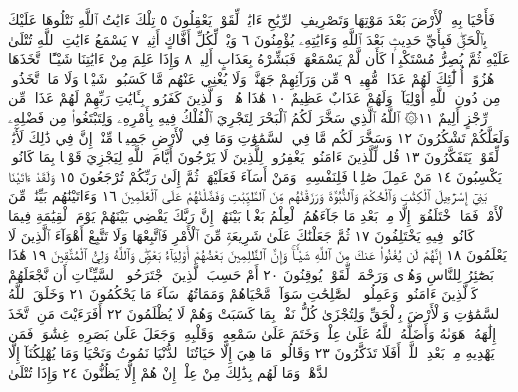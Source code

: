 فَأَحْيَا بِهِ ٱلْأَرْضَ بَعْدَ مَوْتِهَا وَتَصْرِيفِ ٱلرِّيَٰحِ ءَايَٰتࣱ لِّقَوْمࣲ يَعْقِلُونَ ٥
تِلْكَ ءَايَٰتُ ٱللَّهِ نَتْلُوهَا عَلَيْكَ بِٱلْحَقِّۖ فَبِأَيِّ حَدِيثِۭ بَعْدَ ٱللَّهِ وَءَايَٰتِهِۦ
يُؤْمِنُونَ ٦ وَيْلࣱ لِّكُلِّ أَفَّاكٍ أَثِيمࣲ ٧ يَسْمَعُ ءَايَٰتِ ٱللَّهِ تُتْلَىٰ عَلَيْهِ ثُمَّ
يُصِرُّ مُسْتَكْبِرࣰا كَأَن لَّمْ يَسْمَعْهَاۖ فَبَشِّرْهُ بِعَذَابٍ أَلِيمࣲ ٨ وَإِذَا عَلِمَ مِنْ ءَايَٰتِنَا
شَيْـًٔا ٱتَّخَذَهَا هُزُوًاۚ أُو۟لَٰٓئِكَ لَهُمْ عَذَابࣱ مُّهِينࣱ ٩ مِّن وَرَآئِهِمْ جَهَنَّمُۖ
وَلَا يُغْنِي عَنْهُم مَّا كَسَبُوا۟ شَيْـࣰٔا وَلَا مَا ٱتَّخَذُوا۟ مِن دُونِ ٱللَّهِ أَوْلِيَآءَۖ وَلَهُمْ
عَذَابٌ عَظِيمٌ ١٠ هَٰذَا هُدࣰىۖ وَٱلَّذِينَ كَفَرُوا۟ بِـَٔايَٰتِ رَبِّهِمْ لَهُمْ عَذَابࣱ مِّن
رِّجْزٍ أَلِيمٌ ١١۞ ٱللَّهُ ٱلَّذِي سَخَّرَ لَكُمُ ٱلْبَحْرَ لِتَجْرِيَ ٱلْفُلْكُ فِيهِ بِأَمْرِهِۦ
وَلِتَبْتَغُوا۟ مِن فَضْلِهِۦ وَلَعَلَّكُمْ تَشْكُرُونَ ١٢ وَسَخَّرَ لَكُم مَّا فِي ٱلسَّمَٰوَٰتِ
وَمَا فِي ٱلْأَرْضِ جَمِيعࣰا مِّنْهُۚ إِنَّ فِي ذَٰلِكَ لَأٓيَٰتࣲ لِّقَوْمࣲ يَتَفَكَّرُونَ ١٣
قُل لِّلَّذِينَ ءَامَنُوا۟ يَغْفِرُوا۟ لِلَّذِينَ لَا يَرْجُونَ أَيَّامَ ٱللَّهِ لِيَجْزِيَ
قَوْمَۢا بِمَا كَانُوا۟ يَكْسِبُونَ ١٤ مَنْ عَمِلَ صَٰلِحࣰا فَلِنَفْسِهِۦۖ
وَمَنْ أَسَآءَ فَعَلَيْهَاۖ ثُمَّ إِلَىٰ رَبِّكُمْ تُرْجَعُونَ ١٥ وَلَقَدْ ءَاتَيْنَا
بَنِيٓ إِسْرَٰٓءِيلَ ٱلْكِتَٰبَ وَٱلْحُكْمَ وَٱلنُّبُوَّةَ وَرَزَقْنَٰهُم مِّنَ ٱلطَّيِّبَٰتِ
وَفَضَّلْنَٰهُمْ عَلَى ٱلْعَٰلَمِينَ ١٦ وَءَاتَيْنَٰهُم بَيِّنَٰتࣲ مِّنَ ٱلْأَمْرِۖ
فَمَا ٱخْتَلَفُوٓا۟ إِلَّا مِنۢ بَعْدِ مَا جَآءَهُمُ ٱلْعِلْمُ بَغْيَۢا بَيْنَهُمْۚ إِنَّ رَبَّكَ
يَقْضِي بَيْنَهُمْ يَوْمَ ٱلْقِيَٰمَةِ فِيمَا كَانُوا۟ فِيهِ يَخْتَلِفُونَ ١٧
ثُمَّ جَعَلْنَٰكَ عَلَىٰ شَرِيعَةࣲ مِّنَ ٱلْأَمْرِ فَٱتَّبِعْهَا وَلَا تَتَّبِعْ
أَهْوَآءَ ٱلَّذِينَ لَا يَعْلَمُونَ ١٨ إِنَّهُمْ لَن يُغْنُوا۟ عَنكَ مِنَ ٱللَّهِ
شَيْـࣰٔاۚ وَإِنَّ ٱلظَّٰلِمِينَ بَعْضُهُمْ أَوْلِيَآءُ بَعْضࣲۖ وَٱللَّهُ وَلِيُّ ٱلْمُتَّقِينَ ١٩
هَٰذَا بَصَٰٓئِرُ لِلنَّاسِ وَهُدࣰى وَرَحْمَةࣱ لِّقَوْمࣲ يُوقِنُونَ ٢٠
أَمْ حَسِبَ ٱلَّذِينَ ٱجْتَرَحُوا۟ ٱلسَّيِّـَٔاتِ أَن نَّجْعَلَهُمْ كَٱلَّذِينَ
ءَامَنُوا۟ وَعَمِلُوا۟ ٱلصَّٰلِحَٰتِ سَوَآءࣰ مَّحْيَاهُمْ وَمَمَاتُهُمْۚ سَآءَ
مَا يَحْكُمُونَ ٢١ وَخَلَقَ ٱللَّهُ ٱلسَّمَٰوَٰتِ وَٱلْأَرْضَ بِٱلْحَقِّ
وَلِتُجْزَىٰ كُلُّ نَفْسِۭ بِمَا كَسَبَتْ وَهُمْ لَا يُظْلَمُونَ ٢٢
أَفَرَءَيْتَ مَنِ ٱتَّخَذَ إِلَٰهَهُۥ هَوَىٰهُ وَأَضَلَّهُ ٱللَّهُ عَلَىٰ عِلْمࣲ وَخَتَمَ عَلَىٰ سَمْعِهِۦ
وَقَلْبِهِۦ وَجَعَلَ عَلَىٰ بَصَرِهِۦ غِشَٰوَةࣰ فَمَن يَهْدِيهِ مِنۢ بَعْدِ ٱللَّهِۚ أَفَلَا
تَذَكَّرُونَ ٢٣ وَقَالُوا۟ مَا هِيَ إِلَّا حَيَاتُنَا ٱلدُّنْيَا نَمُوتُ وَنَحْيَا وَمَا يُهْلِكُنَآ
إِلَّا ٱلدَّهْرُۚ وَمَا لَهُم بِذَٰلِكَ مِنْ عِلْمٍۖ إِنْ هُمْ إِلَّا يَظُنُّونَ ٢٤ وَإِذَا تُتْلَىٰ
